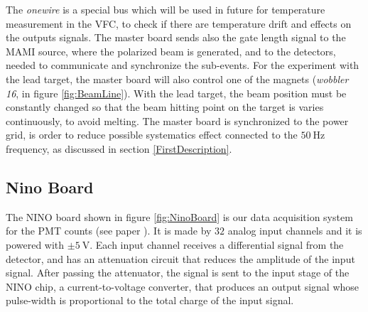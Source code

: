 The \textit{onewire} is a special bus which will be used in future for temperature measurement in the VFC, to check if there are temperature drift and effects on the outputs signals. The master board sends also the gate length signal to the MAMI source, where the polarized beam is generated, and to the detectors, needed to communicate and synchronize the sub-events. 
For the experiment with the lead target, the master board will also control one of the magnets (\textit{wobbler 16}, in figure \ref{fig:BeamLine}). With the lead target, the beam position must be constantly changed so that the beam hitting point on the target is varies continuously, to avoid melting. The master board is synchronized to the power grid, is order to reduce possible systematics effect connected to the $\SI{50}{\hertz}$ frequency, as discussed in section \ref{FirstDescription}.

\subsection{Nino Board} \label{NINO}

The NINO board shown in figure \ref{fig:NinoBoard} is our data acquisition system for the PMT counts (see paper \cite{1352067}). It is made by $32$ analog input channels and it is powered with $\pm \SI{5}{\volt}$.
Each input channel receives a differential signal from the detector, and has an attenuation circuit that reduces the amplitude of the input signal. After passing the attenuator, the signal is sent to the input stage of the NINO chip, a current-to-voltage converter, that produces an output signal whose pulse-width is proportional to the total charge of the input signal.


